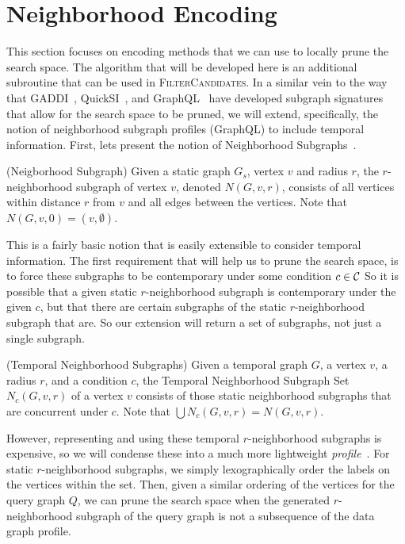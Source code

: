 \section{Neighborhood Encoding}
\label{sec:encoding}

This section focuses on encoding methods that we can use to locally prune the
search space. The algorithm that will be developed here is an additional
subroutine that can be used in \textsc{FilterCandidates}. In a similar vein to
the way that GADDI~\cite{2009-EDBT-GADDI}, QuickSI~\cite{2008-VLDB-QuickSI}, and
GraphQL~\cite{2008-SIGMOD-GraphQL} have developed subgraph signatures that allow
for the search space to be pruned, we will extend, specifically, the notion of
neighborhood subgraph profiles (GraphQL) to include temporal information. First,
lets present the notion of Neighborhood Subgraphs~\cite{2008-SIGMOD-GraphQL}.

\begin{defn}
  (Neigborhood Subgraph) Given a static graph $G_s$, vertex $v$ and radius $r$,
  the $r$-neighborhood subgraph of vertex $v$, denoted $N(G,v,r)$, consists of
  all vertices within distance $r$ from $v$ and all edges between the
  vertices. Note that $N(G,v,0) = ({v}, \emptyset)$.
\end{defn}

This is a fairly basic notion that is easily extensible to consider temporal
information. The first requirement that will help us to prune the search space,
is to force these subgraphs to be contemporary under some condition $c \in \mathcal{C}$
So it is possible that a given static $r$-neighborhood subgraph is contemporary under the
given $c$, but that there are certain subgraphs of the static $r$-neighborhood
subgraph that are.  So our extension will return a set of subgraphs, not just a
single subgraph.

\begin{defn}
  (Temporal Neighborhood Subgraphs) Given a temporal graph $G$, a vertex $v$, a
  radius $r$, and a condition $c$, the Temporal Neighborhood Subgraph Set
  $N_c(G,v,r)$ of a vertex $v$ consists of those static neighborhood subgraphs
  that are concurrent under $c$. Note that $\displaystyle\bigcup N_c(G,v,r) =
  N(G,v,r)$.
\end{defn}

However, representing and using these temporal $r$-neighborhood subgraphs is
expensive, so we will condense these into a much more lightweight
\textit{profile}~\cite{2008-SIGMOD-GraphQL}. For static $r$-neighborhood
subgraphs, we simply lexographically order the labels on the vertices within the
set. Then, given a similar ordering of the vertices for the query graph $Q$, we
can prune the search space when the generated $r$-neighborhood subgraph of the
query graph is not a subsequence of the data graph profile.

